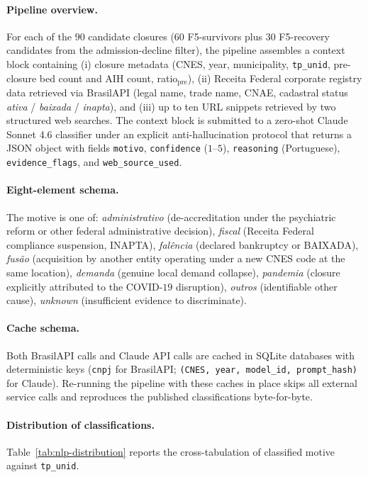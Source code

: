 \paragraph{Pipeline overview.} For each of the $90$ candidate closures
($60$ F5-survivors plus $30$ F5-recovery candidates from the
admission-decline filter), the pipeline assembles a context block
containing (i) closure metadata (CNES, year, municipality,
\texttt{tp\_unid}, pre-closure bed count and AIH count, ratio$_{\text{pre}}$),
(ii) Receita Federal corporate registry data retrieved via BrasilAPI
(legal name, trade name, CNAE, cadastral status \emph{ativa} /
\emph{baixada} / \emph{inapta}), and (iii) up to ten URL snippets
retrieved by two structured web searches. The context block is
submitted to a zero-shot Claude Sonnet 4.6 classifier under an
explicit anti-hallucination protocol that returns a JSON object with
fields \texttt{motivo}, \texttt{confidence} ($1$--$5$),
\texttt{reasoning} (Portuguese), \texttt{evidence\_flags}, and
\texttt{web\_source\_used}.

\paragraph{Eight-element schema.} The motive is one of:
\emph{administrativo} (de-accreditation under the psychiatric reform
or other federal administrative decision), \emph{fiscal} (Receita
Federal compliance suspension, INAPTA), \emph{fal\^encia} (declared
bankruptcy or BAIXADA), \emph{fus\~ao} (acquisition by another entity
operating under a new CNES code at the same location),
\emph{demanda} (genuine local demand collapse), \emph{pandemia}
(closure explicitly attributed to the COVID-$19$ disruption),
\emph{outros} (identifiable other cause), \emph{unknown} (insufficient
evidence to discriminate).

\paragraph{Cache schema.} Both BrasilAPI calls and Claude API calls
are cached in SQLite databases with deterministic keys
(\texttt{cnpj} for BrasilAPI; \texttt{(CNES, year, model\_id, prompt\_hash)}
for Claude). Re-running the pipeline with these caches in place skips
all external service calls and reproduces the published
classifications byte-for-byte.

\paragraph{Distribution of classifications.}
Table~\ref{tab:nlp-distribution} reports the cross-tabulation of
classified motive against \texttt{tp\_unid}.

